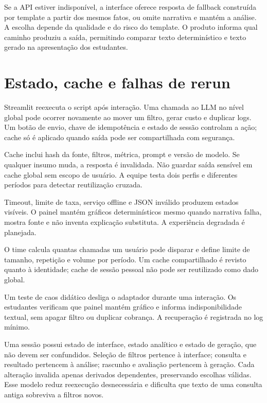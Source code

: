 Se a API estiver indisponível, a interface oferece resposta de fallback construída por template a partir dos mesmos fatos, ou omite narrativa e mantém a análise. A escolha depende da qualidade e do risco do template. O produto informa qual caminho produziu a saída, permitindo comparar texto determinístico e texto gerado na apresentação dos estudantes.

\section{Estado, cache e falhas de rerun}

Streamlit reexecuta o script após interação. Uma chamada ao LLM no nível global pode ocorrer novamente ao mover um filtro, gerar custo e duplicar logs. Um botão de envio, chave de idempotência e estado de sessão controlam a ação; cache só é aplicado quando saída pode ser compartilhada com segurança.

Cache inclui hash da fonte, filtros, métrica, prompt e versão de modelo. Se qualquer insumo muda, a resposta é invalidada. Não guardar saída sensível em cache global sem escopo de usuário. A equipe testa dois perfis e diferentes períodos para detectar reutilização cruzada.

Timeout, limite de taxa, serviço offline e JSON inválido produzem estados visíveis. O painel mantém gráficos determinísticos mesmo quando narrativa falha, mostra fonte e não inventa explicação substituta. A experiência degradada é planejada.

O time calcula quantas chamadas um usuário pode disparar e define limite de tamanho, repetição e volume por período. Um cache compartilhado é revisto quanto à identidade; cache de sessão pessoal não pode ser reutilizado como dado global.

Um teste de caos didático desliga o adaptador durante uma interação. Os estudantes verificam que painel mantém gráfico e informa indisponibilidade textual, sem apagar filtro ou duplicar cobrança. A recuperação é registrada no log mínimo.

Uma sessão possui estado de interface, estado analítico e estado de geração, que não devem ser confundidos. Seleção de filtros pertence à interface; consulta e resultado pertencem à análise; rascunho e avaliação pertencem à geração. Cada alteração invalida apenas derivados dependentes, preservando escolhas válidas. Esse modelo reduz reexecução desnecessária e dificulta que texto de uma consulta antiga sobreviva a filtros novos.

